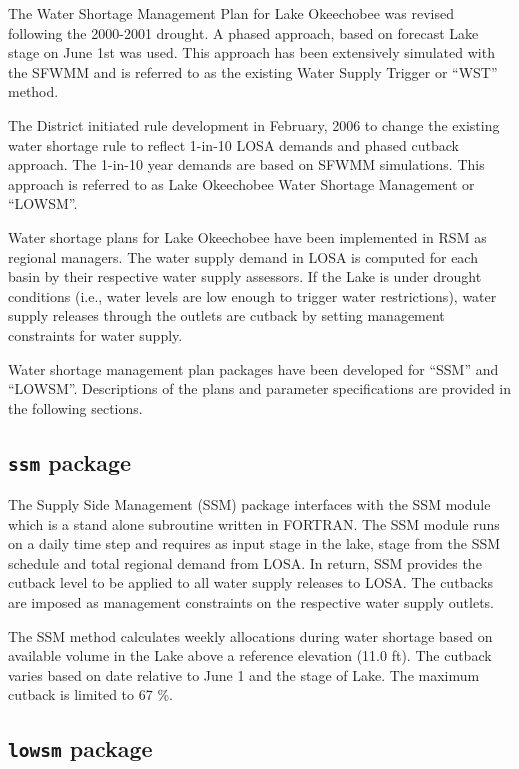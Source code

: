 The Water Shortage Management Plan for Lake Okeechobee was revised
following the 2000-2001 drought.  A phased approach, based on forecast
Lake stage on June 1st was used.  This approach has been extensively
simulated with the SFWMM and is referred to as the existing Water
Supply Trigger or ``WST'' method.  

The District initiated rule development in February, 2006 to change
the existing water shortage rule to reflect 1-in-10 LOSA demands and
phased cutback approach.  The 1-in-10 year demands are based on SFWMM
simulations.  This approach is referred to as Lake Okeechobee Water
Shortage Management or ``LOWSM''.

Water shortage plans for Lake Okeechobee have been implemented in RSM
as regional managers.  The water supply demand in LOSA is computed for
each basin by their respective water supply assessors.  If the Lake is
under drought conditions (i.e., water levels are low enough to trigger
water restrictions), water supply releases through the outlets are
cutback by setting management constraints for water supply.

Water shortage management plan packages have been developed for
``SSM'' and ``LOWSM''.  Descriptions of the plans and parameter
specifications are provided in the following sections.

\subsection { {\tt ssm} package }

The Supply Side Management (SSM) package interfaces with the SSM
module which is a stand alone subroutine written in FORTRAN.  The SSM
module runs on a daily time step and requires as input stage in the
lake, stage from the SSM schedule and total regional demand from LOSA.
In return, SSM provides the cutback level to be applied to all water
supply releases to LOSA.  The cutbacks are imposed as management
constraints on the respective water supply outlets.

The SSM method calculates weekly allocations during water shortage
based on available volume in the Lake above a reference elevation
(11.0 ft).  The cutback varies based on date relative to June 1 and
the stage of Lake.  The maximum cutback is limited to 67 \%.


\subsection { {\tt lowsm} package }

